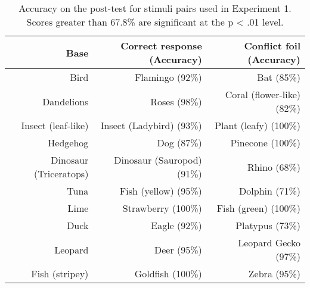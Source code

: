 \begin{table}[h!]
  \centering
  \begin{tabular}{rrr}
    \toprule
    Base                  &  Correct response  (Accuracy)   & Conflict foil       (Accuracy)   \\
    \midrule                                                                                     
    Bird                   & Flamingo           (92\%)  & Bat                  (85\%) \\
    Dandelions             & Roses              (98\%)  & Coral (flower-like)  (82\%) \\
    Insect (leaf-like)     & Insect (Ladybird)  (93\%)  & Plant (leafy)        (100\%)\\
    Hedgehog               & Dog                (87\%)  & Pinecone             (100\%)\\
    Dinosaur (Triceratops) & Dinosaur (Sauropod) (91\%)  & Rhino                (68\%) \\
    Tuna                   & Fish (yellow)      (95\%)  & Dolphin              (71\%) \\
    Lime                   & Strawberry         (100\%) & Fish (green)         (100\%)\\
    Duck                   & Eagle              (92\%)  & Platypus             (73\%) \\
    Leopard                & Deer               (95\%)  & Leopard Gecko        (97\%) \\
    Fish (stripey)         & Goldfish           (100\%) & Zebra                (95\%) \\
    \bottomrule
  \end{tabular}
  \caption[]{
    Accuracy on the post-test for stimuli pairs used in Experiment 1.
    Scores greater than 67.8\% are significant at the p < .01 level.
    }
\end{table}

